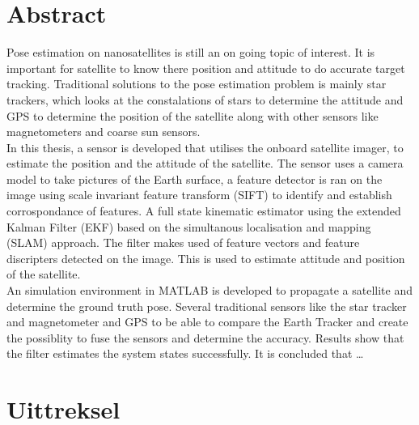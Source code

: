 \chapter*{Abstract}
\makeatletter{}\makeatother

\noindent Pose estimation on nanosatellites is still an on going topic of interest.
It is important for satellite to know there position and attitude to do accurate target tracking.
Traditional solutions to the pose estimation problem is mainly star trackers, which looks at the constalations of stars to determine the attitude
and GPS to determine the position of the satellite along with other sensors like magnetometers and coarse sun sensors.\\

\noindent In this thesis, a sensor is developed that utilises the onboard satellite imager, to estimate the position and the attitude of the satellite.
The sensor uses a camera model to take pictures of the Earth surface, a feature detector is ran on the image using scale invariant feature transform (SIFT)
to identify and establish corrospondance of features. A full state kinematic estimator using the extended Kalman Filter (EKF) based on the simultanous
localisation and mapping (SLAM) approach. The filter makes used of feature vectors and feature discripters detected on the image. This is used to estimate
attitude and position of the satellite.\\

\noindent An simulation environment in MATLAB is developed to propagate a satellite and determine the ground truth pose. Several traditional sensors
like the star tracker and magnetometer and GPS to be able to compare the Earth Tracker and create the possiblity to fuse the sensors and determine the accuracy.
Results show that the filter estimates the system states successfully. It is concluded that \dots


\newpage
{}

\chapter*{Uittreksel}
\makeatletter{}\makeatother

